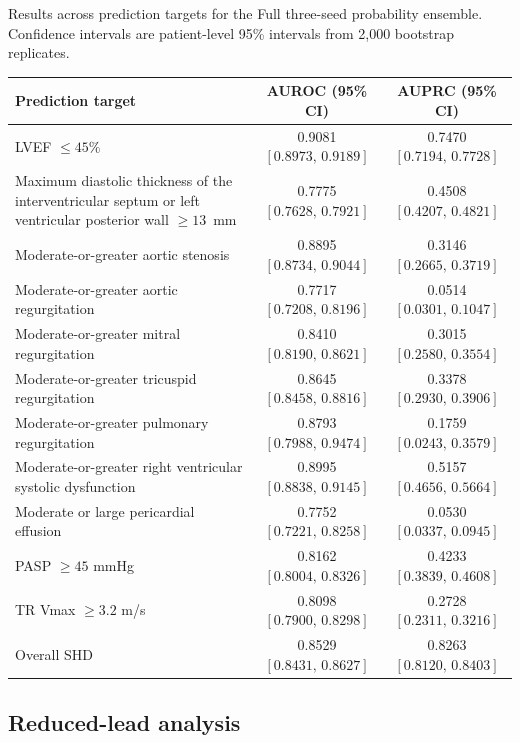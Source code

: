\begin{bspcwidetable}[!tbp]
\centering
\BSPCtableformat

\caption{Results across prediction targets for the Full three-seed probability ensemble. Confidence intervals are patient-level 95\% intervals from 2,000 bootstrap replicates.}
\label{tab:endpoints}
\begin{tabularx}{\textwidth}{Ycc}
\toprule
Prediction target & AUROC (95\% CI) & AUPRC (95\% CI) \\
\midrule
LVEF $\leq45\%$ & 0.9081 $[0.8973,\,0.9189]$ & 0.7470 $[0.7194,\,0.7728]$ \\
Maximum diastolic thickness of the interventricular septum or left ventricular posterior wall $\geq13$~mm & 0.7775 $[0.7628,\,0.7921]$ & 0.4508 $[0.4207,\,0.4821]$ \\
Moderate-or-greater aortic stenosis & 0.8895 $[0.8734,\,0.9044]$ & 0.3146 $[0.2665,\,0.3719]$ \\
Moderate-or-greater aortic regurgitation & 0.7717 $[0.7208,\,0.8196]$ & 0.0514 $[0.0301,\,0.1047]$ \\
Moderate-or-greater mitral regurgitation & 0.8410 $[0.8190,\,0.8621]$ & 0.3015 $[0.2580,\,0.3554]$ \\
Moderate-or-greater tricuspid regurgitation & 0.8645 $[0.8458,\,0.8816]$ & 0.3378 $[0.2930,\,0.3906]$ \\
Moderate-or-greater pulmonary regurgitation & 0.8793 $[0.7988,\,0.9474]$ & 0.1759 $[0.0243,\,0.3579]$ \\
Moderate-or-greater right ventricular systolic dysfunction & 0.8995 $[0.8838,\,0.9145]$ & 0.5157 $[0.4656,\,0.5664]$ \\
Moderate or large pericardial effusion & 0.7752 $[0.7221,\,0.8258]$ & 0.0530 $[0.0337,\,0.0945]$ \\
PASP $\geq45$ mmHg & 0.8162 $[0.8004,\,0.8326]$ & 0.4233 $[0.3839,\,0.4608]$ \\
TR Vmax $\geq3.2$ m/s & 0.8098 $[0.7900,\,0.8298]$ & 0.2728 $[0.2311,\,0.3216]$ \\
Overall SHD & 0.8529 $[0.8431,\,0.8627]$ & 0.8263 $[0.8120,\,0.8403]$ \\
\bottomrule
\end{tabularx}

\end{bspcwidetable}

\BSPCkeependpointorder

\subsection{Reduced-lead analysis}
\label{sec:results_reduced_leads}

